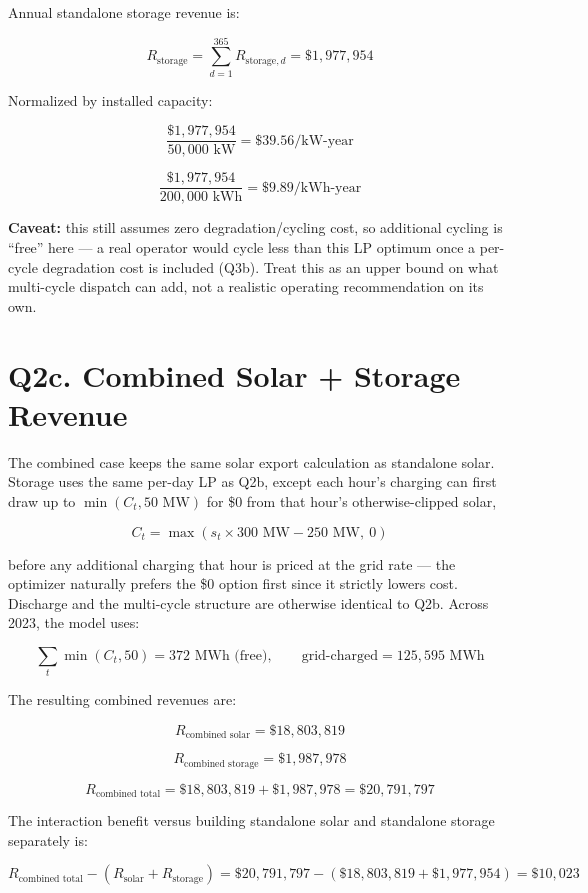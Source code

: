 \documentclass[11pt]{article}
\begin{document}
Annual standalone storage revenue is:

\[
R_{\text{storage}}
= \sum_{d=1}^{365} R_{\text{storage},d}
= \$1{,}977{,}954
\]

Normalized by installed capacity:

\[
\frac{\$1{,}977{,}954}{50{,}000\text{ kW}}
= \$39.56/\text{kW-year}
\]

\[
\frac{\$1{,}977{,}954}{200{,}000\text{ kWh}}
= \$9.89/\text{kWh-year}
\]

\textbf{Caveat:} this still assumes zero degradation/cycling cost, so additional cycling
is ``free'' here --- a real operator would cycle less than this LP optimum once a
per-cycle degradation cost is included (Q3b). Treat this as an upper bound on what
multi-cycle dispatch can add, not a realistic operating recommendation on its own.

\section*{Q2c. Combined Solar + Storage Revenue}

The combined case keeps the same solar export calculation as standalone solar. Storage
uses the same per-day LP as Q2b, except each hour's charging can first draw up to
$\min(C_t, 50\text{ MW})$ for \$0 from that hour's otherwise-clipped solar,

\[
C_t = \max(s_t \times 300\text{ MW} - 250\text{ MW},\ 0)
\]

before any additional charging that hour is priced at the grid rate --- the optimizer
naturally prefers the \$0 option first since it strictly lowers cost. Discharge and the
multi-cycle structure are otherwise identical to Q2b. Across 2023, the model uses:

\[
\sum_t \min(C_t, 50) = 372\text{ MWh (free)}, \qquad
\text{grid-charged} = 125{,}595\text{ MWh}
\]

The resulting combined revenues are:

\[
R_{\text{combined solar}} = \$18{,}803{,}819
\]

\[
R_{\text{combined storage}} = \$1{,}987{,}978
\]

\[
R_{\text{combined total}}
= \$18{,}803{,}819 + \$1{,}987{,}978
= \$20{,}791{,}797
\]

The interaction benefit versus building standalone solar and standalone storage
separately is:

\[
R_{\text{combined total}} -
\left(R_{\text{solar}} + R_{\text{storage}}\right)
= \$20{,}791{,}797 - (\$18{,}803{,}819 + \$1{,}977{,}954)
= \$10{,}023
\]
\end{document}
